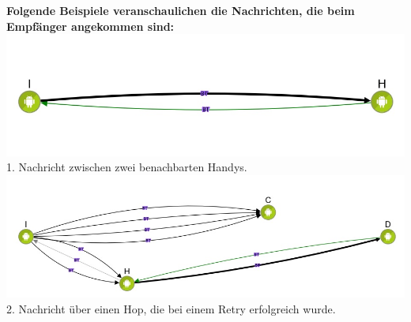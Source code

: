 \textbf{Folgende Beispiele veranschaulichen die Nachrichten, die beim
Empfänger angekommen sind:}\\
\includegraphics[width=1.0\textwidth]{belege/grosstests/Bilder/Test2Erfolg1.jpg}\\
 1. Nachricht
zwischen zwei benachbarten Handys.\\
\includegraphics[width=1.0\textwidth]{belege/grosstests/Bilder/Test2Erfolg2.jpg}\\ 2. Nachricht
über einen Hop, die bei einem Retry erfolgreich wurde.\\

